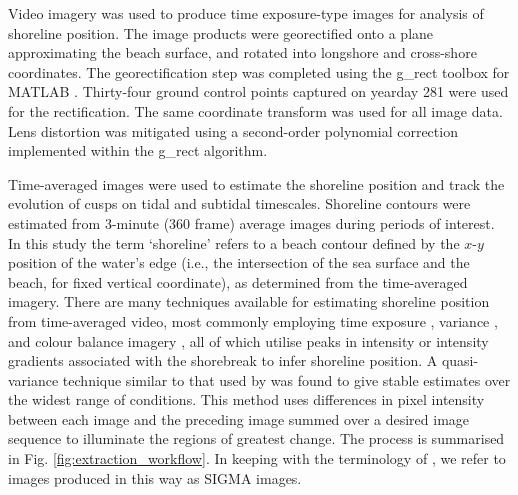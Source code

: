 Video imagery was used to produce time exposure-type images for analysis of shoreline position. The image products were georectified onto a plane approximating the beach surface, and rotated into longshore and cross-shore coordinates. The georectification step was completed using the g\_rect toolbox for MATLAB \citep[e.g.,][]{Bourgault2008, Richards_etal2013}.  Thirty-four ground control points captured on yearday 281 were used for the rectification. The same coordinate transform was used for all image data. Lens distortion was mitigated using a second-order polynomial correction implemented within the g\_rect algorithm.


Time-averaged images were used to estimate the shoreline position and track the evolution of cusps on tidal and subtidal timescales. Shoreline contours were estimated from 3-minute (360 frame) average images during periods of interest. In this study the term `shoreline' refers to a beach contour defined by the $x$-$y$ position of the water's edge (i.e., the intersection of the sea surface and the beach, for fixed vertical coordinate), as determined from the time-averaged imagery. There are many techniques available for estimating shoreline position from time-averaged video, most commonly employing time exposure \citep[TIMEX,][]{Plant_Holman1997, Pearre_Puleo2009}, variance \citep{Holland_etal1997, Pearre_Puleo2009}, and colour balance imagery \citep{Almar_etal2008}, all of which utilise peaks in intensity or intensity gradients associated with the shorebreak to infer shoreline position. A quasi-variance technique similar to that used by \citet{Vousdoukas_etal2011} was found to give stable estimates over the widest range of conditions. This method uses differences in pixel intensity between each image and the preceding image summed over a desired image sequence to illuminate the regions of greatest change. The process is summarised in Fig. \ref{fig:extraction_workflow}. In keeping with the terminology of \citet{Vousdoukas_etal2011}, we refer to images produced in this way as SIGMA images. 

